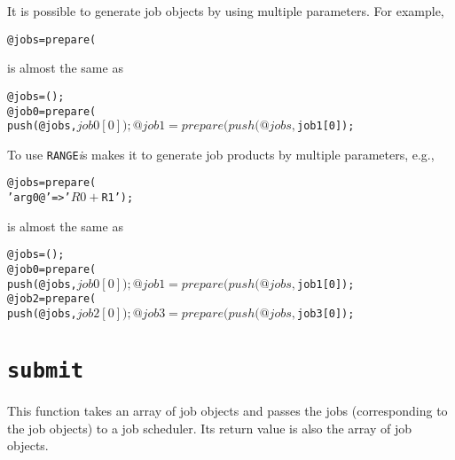 \documentclass[a4paper,10pt]{report}
\begin{document}
It is possible to generate job objects by using multiple parameters.
For example,
\begin{boxnote}
\begin{alltt}
%template = ('id' => '\textit{myjob}', 'exe' => '\textit{./myexe}');
@jobs = prepare(%template, 'arg0@' => [0,1], 'arg1@' => [2,3]);
\end{alltt}
\end{boxnote}
\vspace{\baselineskip}
\noindent
is almost the same as
\begin{boxnote}
\begin{alltt}
%template = ('id' => '\textit{myjob}', 'exe' => '\textit{./myexe}');
@jobs = ();
@job0 = prepare(%template, 'arg0' => '0', 'arg1' => '2');
push(@jobs, $job0[0]);
@job1 = prepare(%template, 'arg0' => '1', 'arg1' => '3');
push(@jobs, $job1[0]);
\end{alltt}
\end{boxnote}
\vspace{\baselineskip}

To use \texttt{RANGE}\textit{i}s makes it to generate job products by
multiple parameters, e.g.,
\begin{boxnote}
\begin{alltt}
%template = ('id' => '\textit{myjob}', 'exe' => '\textit{./myexe}');
@jobs = prepare(%template, 'RANGE0' => [0,1], 'RANGE1' => [2,4],
                           'arg0@' => '$R0 + $R1');
\end{alltt}
\end{boxnote}
\vspace{\baselineskip}
\noindent
is almost the same as
\begin{boxnote}
\begin{alltt}
%template = ('id' => '\textit{myjob}', 'exe' => '\textit{./myexe}');
@jobs = ();
@job0 = prepare(%template, 'arg0' => '0', 'arg1' => '2');
push(@jobs, $job0[0]);
@job1 = prepare(%template, 'arg0' => '0', 'arg1' => '4');
push(@jobs, $job1[0]);
@job2 = prepare(%template, 'arg0' => '1', 'arg1' => '2');
push(@jobs, $job2[0]);
@job3 = prepare(%template, 'arg0' => '1', 'arg1' => '4');
push(@jobs, $job3[0]);
\end{alltt}
\end{boxnote}

\section{\texttt{submit}}\label{sec:submit}

This function takes an array of job objects and passes the jobs
(corresponding to the job objects) to a job scheduler.  Its return
value is also the array of job objects.
\end{document}
